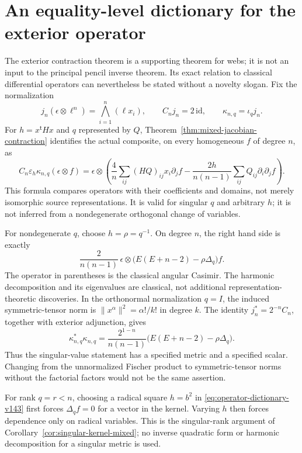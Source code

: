\section{An equality-level dictionary for the exterior operator}
\label{sec:operator-dictionary-v143}

The exterior contraction theorem is a supporting theorem for webs;
it is not an input to the principal pencil inverse theorem.  Its exact
relation to classical differential operators can nevertheless be
stated without a novelty slogan.  Fix the normalization
\[
 j_n(\epsilon\otimes\ell^n)=\bigwedge_{i=1}^n(\ell x_i),
 \qquad C_nj_n=2\,\mathrm{id},\qquad
 \kappa_{n,q}=\iota_qj_n.
\]
For \(h=x^{\mathsf t}Hx\) and \(q\) represented by \(Q\),
Theorem~\ref{thm:mixed-jacobian-contraction} identifies the actual
composite, on every homogeneous \(f\) of degree \(n\), as
\begin{equation}\label{eq:operator-dictionary-v143}
 C_n\varepsilon_h\kappa_{n,q}(\epsilon\otimes f)
 =\epsilon\otimes\left(
 \frac4n\sum_{ij}(HQ)_{ij}x_i\partial_j f
 -\frac{2h}{n(n-1)}\sum_{ij}Q_{ij}\partial_i\partial_j f
 \right).
\end{equation}
This formula compares operators with their coefficients and domains,
not merely isomorphic source representations.  It is valid for singular
\(q\) and arbitrary \(h\); it is not inferred from a nondegenerate
orthogonal change of variables.

For nondegenerate \(q\), choose \(h=\rho=q^{-1}\).  On degree
\(n\), the right hand side is exactly
\[
 \frac{2}{n(n-1)}\,
 \epsilon\otimes\bigl(E(E+n-2)-\rho\Delta_q\bigr)f.
\]
The operator in parentheses is the classical angular Casimir.
The harmonic decomposition and its eigenvalues are classical, not
additional representation-theoretic discoveries.  In the orthonormal
normalization \(q=I\), the induced symmetric-tensor norm is
\(\|x^\alpha\|^2=\alpha!/k!\) in degree \(k\).  The identity
\(j_n^*=2^{-n}C_n\), together with exterior adjunction, gives
\[
 \kappa_{n,q}^*\kappa_{n,q}
 =\frac{2^{1-n}}{n(n-1)}\bigl(E(E+n-2)-\rho\Delta_q\bigr).
\]
Thus the singular-value statement has a specified metric and a
specified scalar.  Changing from the unnormalized Fischer product
to symmetric-tensor norms without the factorial factors would not
be the same assertion.

For rank \(q=r<n\), choosing a radical square \(h=b^2\) in
\eqref{eq:operator-dictionary-v143} first forces \(\Delta_q f=0\)
for a vector in the kernel.  Varying \(h\) then forces dependence
only on radical variables.  This is the singular-rank argument of
Corollary~\ref{cor:singular-kernel-mixed}; no inverse quadratic form
or harmonic decomposition for a singular metric is used.

